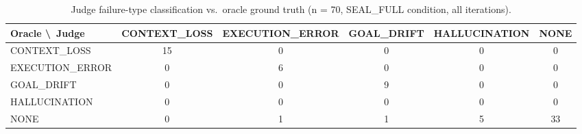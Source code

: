 \begin{table}[t]
\centering
\begin{tabular}{lccccc}
\toprule
Oracle \textbackslash\ Judge & CONTEXT\_LOSS & EXECUTION\_ERROR & GOAL\_DRIFT & HALLUCINATION & NONE \\
\midrule
CONTEXT\_LOSS & 15 & 0 & 0 & 0 & 0 \\
EXECUTION\_ERROR & 0 & 6 & 0 & 0 & 0 \\
GOAL\_DRIFT & 0 & 0 & 9 & 0 & 0 \\
HALLUCINATION & 0 & 0 & 0 & 0 & 0 \\
NONE & 0 & 1 & 1 & 5 & 33 \\
\bottomrule
\end{tabular}
\caption{Judge failure-type classification vs.\ oracle ground truth (n = 70, SEAL\_FULL condition, all iterations).}
\label{tab:judge-confusion}
\end{table}